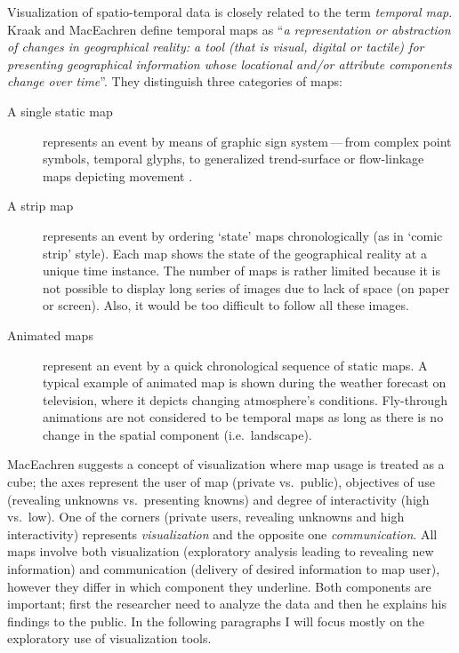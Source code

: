 \documentclass[a4paper,12pt]{book}
\begin{document}
Visualization of spatio-temporal data is closely related to the term \emph{temporal map}.
Kraak and MacEachren \cite{kraak1994visualization} define temporal maps as
``\emph{a representation or abstraction of changes in geographical reality:
a tool (that is visual, digital or tactile) for presenting geographical information
whose locational and/or attribute components change over time}''.
They distinguish three categories of maps:
    \begin{description}
        \item[A single static map] represents an event by means of graphic sign system\,---\,from complex point symbols,
            temporal glyphs, to generalized trend-surface or flow-linkage maps depicting movement \cite{monmonier1990strategies}.

        \item[A strip map] represents an event by ordering `state' maps chronologically (as in `comic strip' style).
            Each map shows the state of the geographical reality at a unique time instance.
            The number of maps is rather limited because it is not possible to display long series of images
            due to lack of space (on paper or screen). Also, it would be too difficult to follow all these images.

        \item[Animated maps] represent an event by a quick chronological sequence of static maps.
            A typical example of animated map is shown during the weather forecast on television,
            where it depicts changing atmosphere's conditions.
            Fly-through animations are not considered to be temporal maps
            as long as there is no change in the spatial component (i.e.\ landscape).
    \end{description}

MacEachren \cite{maceachren1997exploratory} suggests a concept of visualization
where map usage is treated as a cube;
the axes represent the user of map (private vs.\ public),
objectives of use (revealing unknowns vs.\ presenting knowns)
and degree of interactivity (high vs.\ low).
One of the corners (private users, revealing unknowns and high interactivity)
represents \emph{visualization} and the opposite one \emph{communication}.
All maps involve both visualization (exploratory analysis leading to revealing new information)
and communication (delivery of desired information to map user),
however they differ in which component they underline.
Both components are important; first the researcher need to analyze the data
and then he explains his findings to the public.
In the following paragraphs I will focus mostly on the exploratory use of visualization tools.
\end{document}
